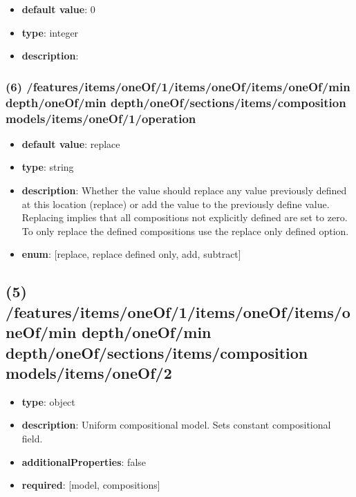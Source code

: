 \begin{itemize}[leftmargin=7em]\item {\bf default value}: 0
\item {\bf type}: integer
\item {\bf description}: 
\end{itemize}\subsubsection{(6) /features/items/oneOf/1/items/oneOf/items/oneOf/min depth/oneOf/min depth/oneOf/sections/items/composition models/items/oneOf/1/operation}
\begin{itemize}[leftmargin=6em]\item {\bf default value}: replace
\item {\bf type}: string
\item {\bf description}: Whether the value should replace any value previously defined at this location (replace) or add the value to the previously define value. Replacing implies that all compositions not explicitly defined are set to zero. To only replace the defined compositions use the replace only defined option.
\item {\bf enum}: [replace, replace defined only, add, subtract]\end{itemize}\subsection{(5) /features/items/oneOf/1/items/oneOf/items/oneOf/min depth/oneOf/min depth/oneOf/sections/items/composition models/items/oneOf/2}
\begin{itemize}[leftmargin=5em]\item {\bf type}: object
\item {\bf description}: Uniform compositional model. Sets constant compositional field.
\item {\bf additionalProperties}: false
\item {\bf required}: [model, compositions]\end{itemize}
